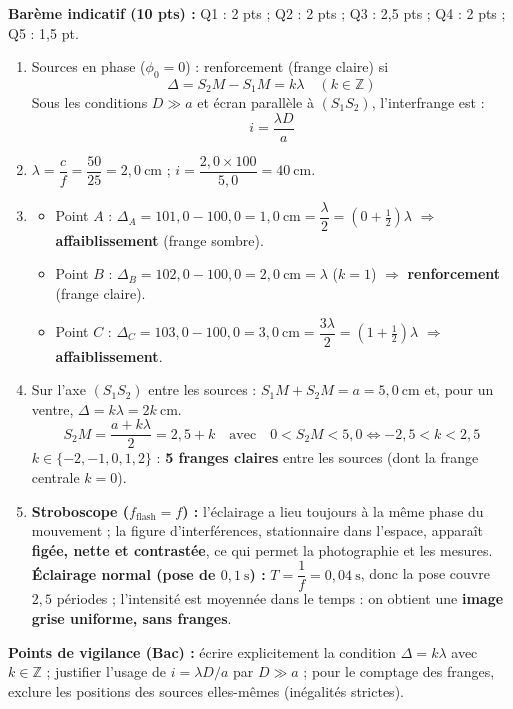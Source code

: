\documentclass[11pt]{article}
\begin{document}
\begin{corrige}
\textbf{Barème indicatif (10 pts) :} Q1 : 2 pts ; Q2 : 2 pts ; Q3 : 2,5 pts ; Q4 : 2 pts ; Q5 : 1,5 pt.

\begin{enumerate}
    \item Sources en phase ($\phi_0 = 0$) : renforcement (frange claire) si
    \[
    \Delta = S_2M - S_1M = k\lambda \quad (k \in \mathbb{Z})
    \]
    Sous les conditions $D \gg a$ et écran parallèle à $(S_1S_2)$, l'interfrange est :
    \[
    i = \frac{\lambda D}{a}
    \]
    \item $\lambda = \dfrac{c}{f} = \dfrac{50}{25} = 2{,}0\ \text{cm}$ ; \quad $i = \dfrac{2{,}0 \times 100}{5{,}0} = 40\ \text{cm}$.
    \item 
    \begin{itemize}
        \item Point $A$ : $\Delta_A = 101{,}0 - 100{,}0 = 1{,}0\ \text{cm} = \dfrac{\lambda}{2} = \left(0 + \tfrac{1}{2}\right)\lambda$ $\Rightarrow$ \textbf{affaiblissement} (frange sombre).
        \item Point $B$ : $\Delta_B = 102{,}0 - 100{,}0 = 2{,}0\ \text{cm} = \lambda$ ($k = 1$) $\Rightarrow$ \textbf{renforcement} (frange claire).
        \item Point $C$ : $\Delta_C = 103{,}0 - 100{,}0 = 3{,}0\ \text{cm} = \dfrac{3\lambda}{2} = \left(1 + \tfrac{1}{2}\right)\lambda$ $\Rightarrow$ \textbf{affaiblissement}.
    \end{itemize}
    \item Sur l'axe $(S_1S_2)$ entre les sources : $S_1M + S_2M = a = 5{,}0\ \text{cm}$ et, pour un ventre, $\Delta = k\lambda = 2k\ \text{cm}$.
    \[
    S_2M = \frac{a + k\lambda}{2} = 2{,}5 + k \quad\text{avec}\quad 0 < S_2M < 5{,}0 \iff -2{,}5 < k < 2{,}5
    \]
    $k \in \{-2, -1, 0, 1, 2\}$ : \textbf{5 franges claires} entre les sources (dont la frange centrale $k=0$).
    \item \textbf{Stroboscope ($f_{\text{flash}} = f$) :} l'éclairage a lieu toujours à la même phase du mouvement ; la figure d'interférences, stationnaire dans l'espace, apparaît \textbf{figée, nette et contrastée}, ce qui permet la photographie et les mesures.
    \textbf{Éclairage normal (pose de $0{,}1\ \text{s}$) :} $T = \dfrac{1}{f} = 0{,}04\ \text{s}$, donc la pose couvre $2{,}5$ périodes ; l'intensité est moyennée dans le temps : on obtient une \textbf{image grise uniforme, sans franges}.
\end{enumerate}
\textbf{Points de vigilance (Bac) :} écrire explicitement la condition $\Delta = k\lambda$ avec $k \in \mathbb{Z}$ ; justifier l'usage de $i = \lambda D/a$ par $D \gg a$ ; pour le comptage des franges, exclure les positions des sources elles-mêmes (inégalités strictes).
\end{corrige}
\end{document}
